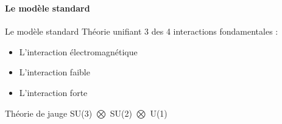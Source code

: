 \documentclass[8pt]{beamer}
\begin{document}
  \begin{frame}
  \frametitle{\secname}
  \framesubtitle{Le modèle standard}
    \begin{minipage}{0.6\linewidth}
      \begin{block}{Le modèle standard}
        Théorie unifiant 3 des 4 interactions fondamentales :
        \begin{itemize}
          \item L'interaction électromagnétique
          \item L'interaction faible
          \item L'interaction forte
        \end{itemize}
        Théorie de jauge SU(3) $\bigotimes$ SU(2) $\bigotimes$ U(1)
      \end{block}
      ~
    \end{minipage} \hfill
    \begin{minipage}{0.38\linewidth}
    \end{minipage}
    \begin{minipage}{0.46\linewidth}
      \begin{center}
        \begin{tikzpicture}

\end{tikzpicture}
\end{center}
\end{minipage}
\end{frame}
\end{document}
